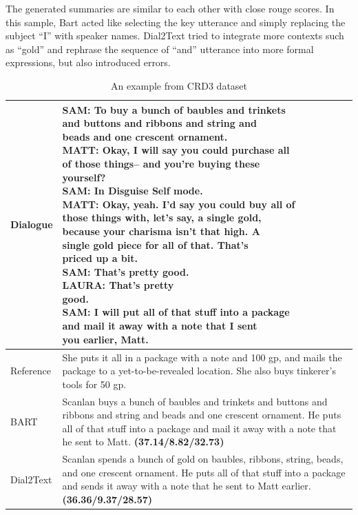 \documentclass[letterpaper]{article} %
\begin{document}
The generated summaries are similar to each other with close rouge scores. In this sample, Bart acted like selecting the key utterance and simply replacing the subject ``I'' with speaker names. Dial2Text tried to integrate more contexts such as ``gold'' and rephrase the sequence of ``and'' utterance into more formal expressions, but also introduced errors.

\begin{table}
	\centering
	\small
	\begin{tabular}{p{1.2cm}p{6cm}}
		\toprule[1pt]
		Dialogue &\makecell[l]{SAM: To buy a bunch of baubles and trinkets \\\quad\quad\quad and buttons and ribbons and string and \\\quad\quad\quad beads and one crescent ornament. \\
			MATT: Okay, I will say you could purchase all \\\quad\quad\quad of those things-- and you're buying these \\\quad\quad\quad yourself? \\
			SAM: In Disguise Self mode. \\
			MATT: Okay, yeah. I'd say you could buy all of \\\quad\quad\quad those things with, let's say, a single gold, \\\quad\quad\quad because your charisma isn't that high. A \\\quad\quad\quad single gold piece for all of that. That's \\\quad\quad\quad priced up a bit. \\
			SAM: That's pretty good. \\\quad\quad\quad LAURA: That's pretty \\\quad\quad\quad good. \\
			SAM: I will put all of that stuff into a package \\\quad\quad\quad and mail it away with a note that I sent \\\quad\quad\quad you earlier, Matt.\\
		}\\
		\hline
		Reference & She puts it all in a package with a note and 100 gp, and mails the package to a yet-to-be-revealed location. She also buys tinkerer's tools for 50 gp.\\
		\hline
		BART &  Scanlan buys a bunch of baubles and trinkets and buttons and ribbons and string and beads and one crescent ornament. He puts all of that stuff into a package and mail it away with a note that he sent to Matt. \textbf{(37.14/8.82/32.73)}\\
		\hline
		Dial2Text &   Scanlan spends a bunch of gold on baubles, ribbons, string, beads, and one crescent ornament. He puts all of that stuff into a package and sends it away with a note that he sent to Matt earlier. \textbf{(36.36/9.37/28.57)}\\
		\bottomrule[1pt]
	\end{tabular}	
	\caption{An example from CRD3 dataset}
	\label{tab:crd3case}  	
\end{table}
\end{document}
